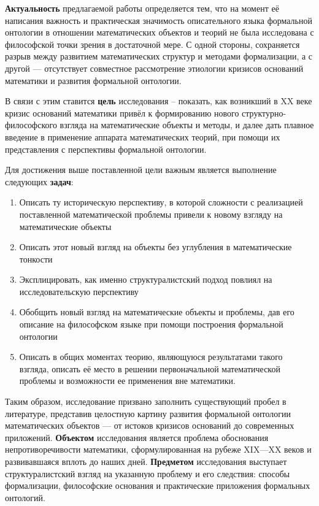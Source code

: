 	\textbf{Актуальность} предлагаемой работы определяется тем, что на момент её написания важность и практическая значимость описательного языка формальной онтологии в отношении математических объектов и теорий не была исследована с философской точки зрения в достаточной мере. С одной стороны, сохраняется разрыв между развитием математических структур и методами формализации, а с другой — отсутствует совместное рассмотрение этиологии кризисов оснований математики и развития формальной онтологии. 
	
	В связи с этим ставится \textbf{цель} исследования -- показать, как возникший в XX веке кризис оснований математики привёл к формированию нового структурно-философского взгляда на математические объекты и методы, и далее дать плавное введение в применение аппарата математических теорий, при помощи их представления с перспективы формальной онтологии.
	
	Для достижения выше поставленной цели важным является выполнение следующих \textbf{задач}:
	\begin{enumerate}[leftmargin=1em]
		\item Описать ту историческую перспективу, в которой сложности с реализацией поставленной математической проблемы привели к новому взгляду на математические объекты 
		\item Описать этот новый взгляд на объекты без углубления в математические тонкости
		\item Эксплицировать, как именно структуралистский подход повлиял на исследовательскую перспективу
		\item Обобщить новый взгляд на математические объекты и проблемы, дав его описание на философском языке при помощи построения формальной онтологии
		\item Описать в общих моментах теорию, являющуюся результатами такого взгляда, описать её место в решении первоначальной математической проблемы и возможности ее применения вне математики.
	\end{enumerate}
	
	Таким образом, исследование призвано заполнить существующий пробел в литературе, представив целостную картину развития формальной онтологии математических объектов — от истоков кризисов оснований до современных приложений.
	\textbf{Объектом} исследования является проблема обоснования непротиворечивости математики, сформулированная на рубеже XIX—XX веков и развивавшаяся вплоть до наших дней. \textbf{Предметом} исследования выступает структуралистский взгляд на указанную проблему и его следствия: способы формализации, философские основания и практические приложения формальных онтологий.
	
